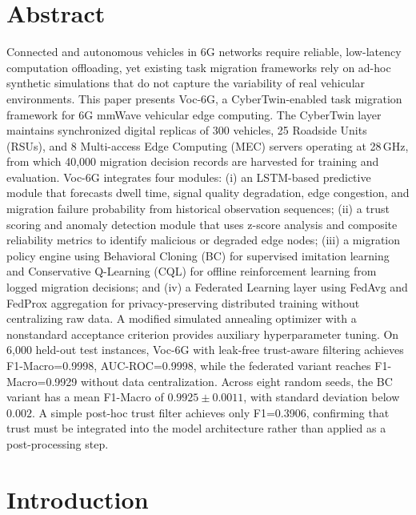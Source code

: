 \documentclass[10pt,letterpaper]{article}
\providecommand{\VocSixG}{Voc-6G}
\begin{document}
\section*{Abstract}
Connected and autonomous vehicles in 6G networks require reliable, low-latency computation offloading, yet existing task migration frameworks rely on ad-hoc synthetic simulations that do not capture the variability of real vehicular environments. This paper presents \VocSixG{}, a CyberTwin-enabled task migration framework for 6G mmWave vehicular edge computing. The CyberTwin layer maintains synchronized digital replicas of 300 vehicles, 25 Roadside Units (RSUs), and 8 Multi-access Edge Computing (MEC) servers operating at 28\,GHz, from which 40,000 migration decision records are harvested for training and evaluation. \VocSixG{} integrates four modules: (i) an LSTM-based predictive module that forecasts dwell time, signal quality degradation, edge congestion, and migration failure probability from historical observation sequences; (ii) a trust scoring and anomaly detection module that uses z-score analysis and composite reliability metrics to identify malicious or degraded edge nodes; (iii) a migration policy engine using Behavioral Cloning (BC) for supervised imitation learning and Conservative Q-Learning (CQL) for offline reinforcement learning from logged migration decisions; and (iv) a Federated Learning layer using FedAvg and FedProx aggregation for privacy-preserving distributed training without centralizing raw data. A modified simulated annealing optimizer with a nonstandard acceptance criterion provides auxiliary hyperparameter tuning. On 6,000 held-out test instances, \VocSixG{} with leak-free trust-aware filtering achieves F1-Macro=0.9998, AUC-ROC=0.9998, while the federated variant reaches F1-Macro=0.9929 without data centralization. Across eight random seeds, the BC variant has a mean F1-Macro of $0.9925 \pm 0.0011$, with standard deviation below $0.002$. A simple post-hoc trust filter achieves only F1=0.3906, confirming that trust must be integrated into the model architecture rather than applied as a post-processing step.



\linenumbers

\section*{Introduction}
\label{sec:introduction}
\end{document}
